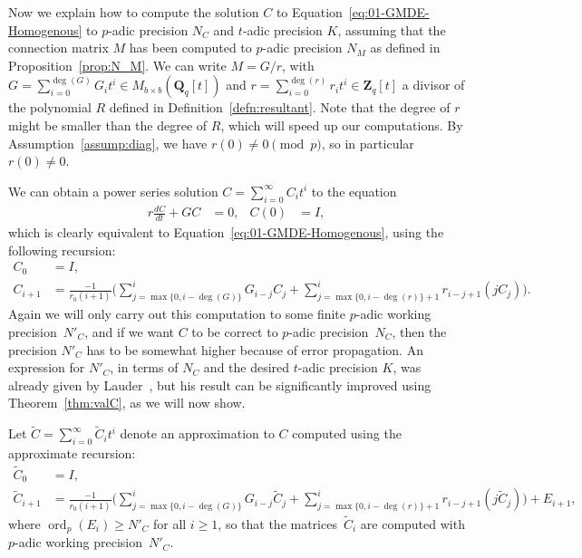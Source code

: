 \documentclass[a4paper,11pt]{article}
\numberwithin{equation}{section}
\newcommand{\ZZ}{\mathbf{Z}} %
\newcommand{\QQ}{\mathbf{Q}} %
\DeclareMathOperator{\ord}{ord}          %
\theoremstyle{definition}
\begin{document}
Now we explain how to compute the solution $C$ to Equation~\eqref{eq:01-GMDE-Homogenous} 
to $p$-adic precision $N_C$ and $t$-adic precision $K$, assuming that the connection 
matrix $M$ has been computed to $p$-adic precision $N_M$ as defined in 
Proposition~\ref{prop:N_M}. We can write $M = G/r$, with 
$G = \sum_{i=0}^{\deg(G)} G_i t^i \in M_{b \times b}(\QQ_q[t])$ 
and $r = \sum_{i=0}^{\deg(r)} r_i t^i \in \ZZ_q[t]$ a divisor of the polynomial $R$ defined in 
Definition~\ref{defn:resultant}. 
Note that the degree of $r$ might be smaller than the degree 
of $R$, which will speed up our computations. By Assumption~\ref{assump:diag}, we have
$r(0) \neq 0 \pmod{p}$, so in particular $r(0) \neq 0$.  

We can obtain a power series solution $C = \sum_{i=0}^{\infty} C_i t^i$ to
the equation
\begin{align*}
r \frac{dC}{dt} + G C &= 0, &C(0)& = I,
\end{align*}
which is clearly equivalent to 
Equation~\eqref{eq:01-GMDE-Homogenous}, using the following recursion:  
\begin{align} \label{eq:recursiondifeq}
C_0 &= I, \nonumber \\
C_{i+1} &= \frac{-1}{r_0 (i+1)} \biggl(
    \sum_{j=\max{\{0,i-\deg(G)\}}}^i G_{i-j} C_j + 
    \sum_{j=\max{\{0,i-\deg(r)\}}+1}^i r_{i-j+1} (j C_j) \biggr).
\end{align}
Again we will only carry out this computation to some finite $p$-adic 
working precision~$N'_C$, and if we want $C$ to be correct to $p$-adic 
precision~$N_C$, then the precision $N'_C$ has to be somewhat higher 
because of error propagation. An expression for $N'_C$, in terms of 
$N_C$ and the desired $t$-adic precision $K$, was already given by 
Lauder~\citep[Theorem~5.1]{Lauder2006}, but his result can be
significantly improved using Theorem~\ref{thm:valC}, as we will now show. 

Let $\tilde{C}=\sum_{i=0}^{\infty} \tilde{C}_i t^i$ denote an 
approximation to $C$ computed using the approximate recursion:  
\begin{align*}
\tilde{C}_0 &= I, \\
\tilde{C}_{i+1} &= \frac{-1}{r_0 (i+1)} \biggl(
    \sum_{j=\max{\{0,i-\deg({G})\}}}^i {G}_{i-j} \tilde{C}_j + 
    \sum_{j=\max{\{0,i-\deg({r})\}}+1}^i {r}_{i-j+1} (j \tilde{C}_j) \biggr) + {E}_{i+1},
\end{align*}
where $\ord_p({E}_i) \geq N'_{C}$ for all $i \geq 1$, 
so that the matrices~$\tilde{C}_i$ are computed with $p$-adic working 
precision~$N'_C$.
\end{document}

